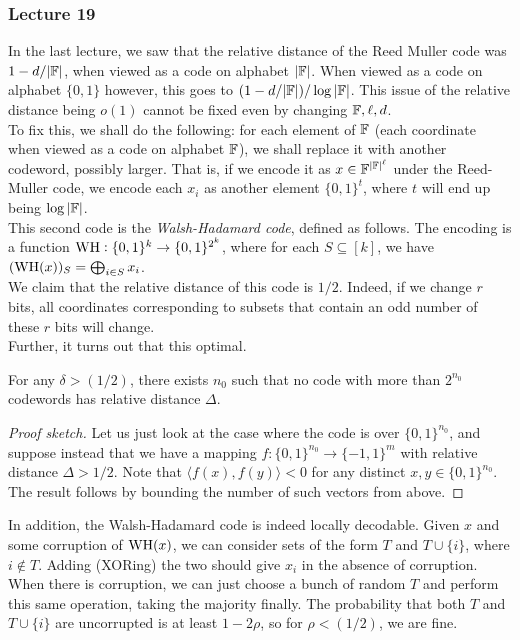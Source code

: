 	\subsubsection{Lecture 19}

		In the last lecture, we saw that the relative distance of the Reed Muller code was $1 - d/|\mathbb{F}|$, when viewed as a code on alphabet $|\mathbb{F}|$. When viewed as a code on alphabet $\{0,1\}$ however, this goes to $(1 - d/|\mathbb{F}|)/\log|\mathbb{F}|$. This issue of the relative distance being $o(1)$ cannot be fixed even by changing $\mathbb{F},\ell,d$.\\
		To fix this, we shall do the following: for each element of $\mathbb{F}$ (each coordinate when viewed as a code on alphabet $\mathbb{F}$), we shall replace it with another codeword, possibly larger. That is, if we encode it as $x \in \mathbb{F}^{|\mathbb{F}|^\ell}$ under the Reed-Muller code, we encode each $x_i$ as another element $\{0,1\}^{t}$, where $t$ will end up being $\log |\mathbb{F}|$.\\

		This second code is the \emph{Walsh-Hadamard code}, defined as follows. The encoding is a function $\operatorname{WH} : \{0,1\}^k \to \{0,1\}^{2^k}$, where for each $S \subseteq [k]$, we have $(\operatorname{WH}(x))_S = \bigoplus_{i \in S} x_i$.\\
		We claim that the relative distance of this code is $1/2$. Indeed, if we change $r$ bits, all coordinates corresponding to subsets that contain an odd number of these $r$ bits will change.\\
		Further, it turns out that this optimal.

		\begin{fprop}
			For any $\delta > (1/2)$, there exists $n_0$ such that no code with more than $2^{n_0}$ codewords has relative distance $\Delta$.
		\end{fprop}
		\begin{proof}[Proof sketch]
			Let us just look at the case where the code is over $\{0,1\}^{n_0}$, and suppose instead that we have a mapping $f : \{0,1\}^{n_0} \to \{-1,1\}^m$ with relative distance $\Delta > 1/2$. Note that $\langle  f(x),f(y) \rangle < 0$ for any distinct $x,y \in \{0,1\}^{n_0}$. The result follows by bounding the number of such vectors from above.
		\end{proof}
		
		In addition, the Walsh-Hadamard code is indeed locally decodable. Given $x$ and some corruption of $\operatorname{WH}(x)$, we can consider sets of the form $T$ and $T \cup \{i\}$, where $i \not\in T$. Adding (XORing) the two should give $x_i$ in the absence of corruption. When there is corruption, we can just choose a bunch of random $T$ and perform this same operation, taking the majority finally. The probability that both $T$ and $T \cup \{i\}$ are uncorrupted is at least $1-2\rho$, so for $\rho < (1/2)$, we are fine.\\
		

